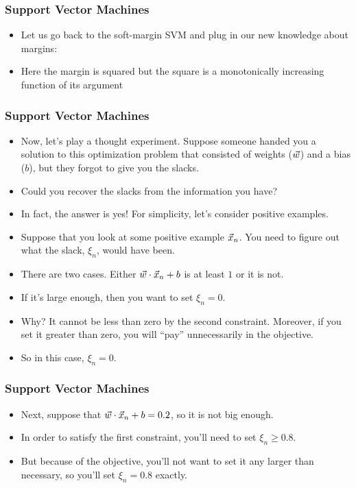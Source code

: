 \documentclass[trans,aspectratio=169]{beamer}
\begin{document}
\begin{frame}
  \frametitle{Support Vector Machines}
\begin{itemize}
\item   Let us go back to the soft-margin SVM and
plug in our new knowledge about margins:
%
%
\item Here the margin is squared but the square is a monotonically increasing function
of its argument
\end{itemize}
\end{frame}
\begin{frame}
  \frametitle{Support Vector Machines}
\begin{itemize}
\item 
Now, let's play a thought experiment.  Suppose someone handed you a
solution to this optimization problem that consisted of weights
(${\vec w}$) and a bias ($b$), but they forgot to give you the slacks.
\item 
Could you recover the slacks from the information you have?
\item
In fact, the answer is yes!  For simplicity, let's consider positive
examples. 
\item  Suppose that you look at some positive example ${\vec x}_n$.
You need to figure out what the slack, $\xi_n$, would have been.
\item 
There are two cases.  Either ${\vec w} \cdot {\vec x}_n+b$ is at least $1$ or
it is not.
\item   If it's large enough, then you want to set $\xi_n = 0$.
\item
Why?  It cannot be less than zero by the second constraint.  Moreover,
if you set it greater than zero, you will ``pay'' unnecessarily in the
objective. 
\item  So in this case, $\xi_n=0$. 
\end{itemize}
\end{frame}
\begin{frame}
  \frametitle{Support Vector Machines}
\begin{itemize}
\item 
 Next, suppose that
${\vec w} \cdot {\vec x}_n+b = 0.2$, so it is not big enough.  
\item In order to
satisfy the first constraint, you'll need to set $\xi_n \geq 0.8$.
\item But because of the objective, you'll not want to set it any larger
than necessary, so you'll set $\xi_n = 0.8$ exactly.
\end{itemize}
\end{frame}
\end{document}
